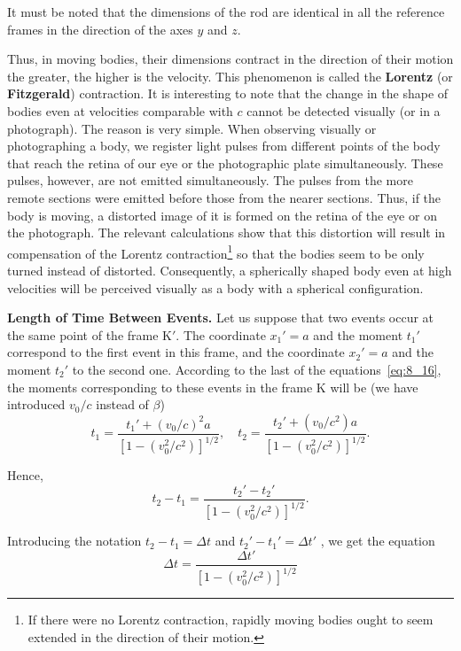 It must be noted that the dimensions of the rod are identical in all the reference frames in the direction of the axes $y$ and $z$.

Thus, in moving bodies, their dimensions contract in the direction of their motion the greater, the higher is the velocity. This phenomenon is called the \textbf{Lorentz} (or \textbf{Fitzgerald}) contraction. It is interesting to note that the change in the shape of bodies even at velocities comparable with $c$ cannot be detected visually (or in a photograph). The reason is very simple. When observing visually or photographing a body, we register light pulses from different points of the body that reach the retina of our eye or the photographic plate simultaneously. These pulses, however, are not emitted simultaneously. The pulses from the more remote sections were emitted before those from the nearer sections. Thus, if the body is moving, a distorted image of it is formed on the retina of the eye or on the photograph. The relevant calculations show that this distortion will result in compensation of the Lorentz contraction\footnote{If there were no Lorentz contraction, rapidly moving bodies ought to seem extended in the direction of their motion.} so that the bodies seem to be only turned instead of distorted. Consequently, a spherically shaped body even at high velocities will be perceived visually as a body with a spherical configuration.

\textbf{Length of Time Between Events.} Let us suppose that two events occur at the same point of the frame K$'$. The coordinate $x_1'=a$ and the moment $t_1'$ correspond to the first event in this frame, and the coordinate $x_2'=a$ and the moment $t_2'$ to the second one. According to the last of the equations~\eqref{eq:8_16}, the moments corresponding to these events in the frame K will be (we have introduced $v_0/c$ instead of $\beta$)
\begin{equation*}
	t_1 = \frac{t_1' + (v_0/c)^2 a}{\left[1 - \left(v_0^2/c^2\right)\right]^{1/2}},\quad t_2 = \frac{t_2' + (v_0/c^2) a}{\left[1 - \left(v_0^2/c^2\right)\right]^{1/2}}.
\end{equation*}

\noindent
Hence,
\begin{equation*}
	t_2 - t_1 = \frac{t_2' - t_2'}{\left[1 - \left(v_0^2/c^2\right)\right]^{1/2}}.
\end{equation*}

Introducing the notation $t_2-t_1=\Delta t$ and $t_2'-t_1'=\Delta t'$ , we get the equation
\begin{equation}\label{eq:8_20}
	\Delta t = \frac{\Delta t'}{\left[1 - \left(v_0^2/c^2\right)\right]^{1/2}}
\end{equation}

